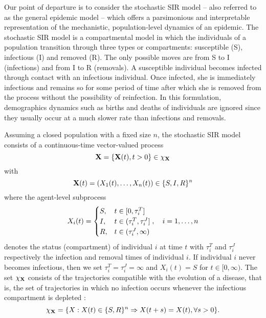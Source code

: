 \documentclass[11pt]{article}
\begin{document}
	Our point of departure is to consider the stochastic SIR model -- also referred to as the general epidemic model -- which offers a parsimonious and interpretable representation of the mechanistic, population-level dynamics of an epidemic. The stochastic SIR model is a compartmental model in which the individuals of a population transition through three types or compartments: susceptible (S), infectious (I) and removed (R). The only possible moves are from S to I (infections) and from I to R (removals). A susceptible individual becomes infected through contact with an infectious individual. Once infected, she is immediately infectious and remains so for some period of time after which she is removed from the process without the possibility of reinfection. In this formulation, demographics dynamics such as births and deaths of individuals are ignored since they usually occur at a much slower rate than infections and removals.
	
	Assuming a closed population with a fixed size $n$, the stochastic SIR model consists of a continuous-time vector-valued process
	\begin{equation}
		\label{eq:X}
		\mathbf{X} = \left\lbrace \mathbf{X}(t), t>0\right\rbrace \in \chi_{\mathbf{X}}
	\end{equation}
	with
	\begin{equation}
		\mathbf{X}(t) = (X_1(t), \dots, X_n(t)) \in \{S, I, R\}^n
	\end{equation}
	where the agent-level subprocess
	$$ X_i(t) = 
	\begin{cases}
		S, & t \in [0, \tau^T_i] \\
		I, & t \in (\tau^T_i, \tau^J_i] \\
		R, & t \in (\tau^J_i, \infty)
	\end{cases}
	,\quad i=1,\dots,n
	$$
	denotes the status (compartment) of individual $i$ at time $t$ with $\tau^T_i$ and $\tau^J_i$ respectively the infection and removal times of individual $i$. If individual $i$ never becomes infectious, then we set $\tau^T_i = \tau^J_i = \infty$ and $X_i(t) = S$ for $t \in [0, \infty)$. The set $\chi_{\mathbf{X}}$ consists of the trajectories compatible with the evolution of a disease, that is, the set of trajectories in which no infection occurs whenever the infectious compartment is depleted :
	\begin{equation}
		\label{eq:chi}
		\chi_{\mathbf{X}} = \{X:X(t) \in \{S,R\}^n \Rightarrow X(t+s) = X(t), \forall s>0 \}.
	\end{equation}
	
\end{document}
